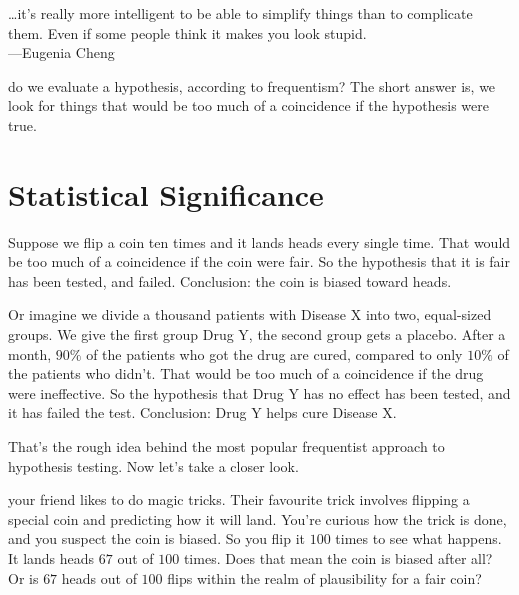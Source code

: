 \documentclass[justified]{tufte-book}
\newenvironment{epigraph}%
{
\begin{flushright}    
\begin{minipage}{20em}
\begin{flushright}
\itshape
}%
{
\end{flushright}
\end{minipage}
\end{flushright}
}
\theoremstyle{definition}
\theoremstyle{definition}
\theoremstyle{definition}
\theoremstyle{definition}
\theoremstyle{remark}
\begin{document}
\begin{epigraph}
\ldots it's really more intelligent to be able to simplify things than
to complicate them. Even if some people think it makes you look
stupid.\\
---Eugenia Cheng
\end{epigraph}

 do we evaluate a hypothesis, according to frequentism? The short answer is, we look for things that would be too much of a coincidence if the hypothesis were true.

\hypertarget{statistical-significance}{%
\section{Statistical Significance}\label{statistical-significance}}

Suppose we flip a coin ten times and it lands heads every single time. That would be too much of a coincidence if the coin were fair. So the hypothesis that it is fair has been tested, and failed. Conclusion: the coin is biased toward heads.

Or imagine we divide a thousand patients with Disease X into two, equal-sized groups. We give the first group Drug Y, the second group gets a placebo. After a month, \(90\%\) of the patients who got the drug are cured, compared to only \(10\%\) of the patients who didn't. That would be too much of a coincidence if the drug were ineffective. So the hypothesis that Drug Y has no effect has been tested, and it has failed the test. Conclusion: Drug Y helps cure Disease X.

That's the rough idea behind the most popular frequentist approach to hypothesis testing. Now let's take a closer look.

 your friend likes to do magic tricks. Their favourite trick involves flipping a special coin and predicting how it will land. You're curious how the trick is done, and you suspect the coin is biased. So you flip it \(100\) times to see what happens. It lands heads \(67\) out of \(100\) times. Does that mean the coin is biased after all? Or is \(67\) heads out of \(100\) flips within the realm of plausibility for a fair coin?
\end{document}
